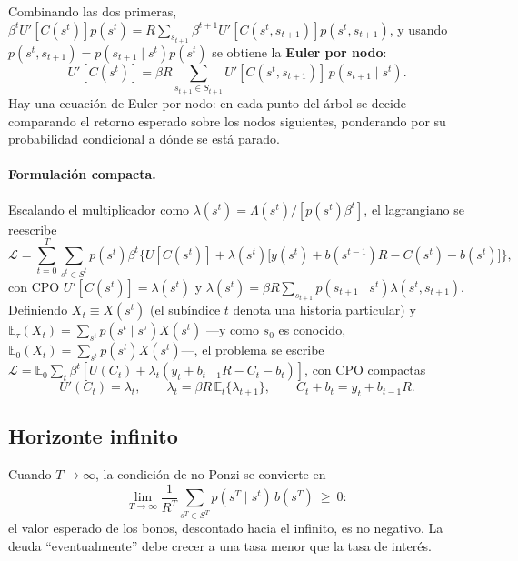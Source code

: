 \documentclass[11pt]{article}
\theoremstyle{definition}
\newcommand{\E}{\mathbb{E}}
\begin{document}
Combinando las dos primeras,
$\beta^{t}U'[C(s^{t})]p(s^{t})=R\sum_{s_{t+1}}\beta^{t+1}U'[C(s^{t},s_{t+1})]p(s^{t},s_{t+1})$, y usando
$p(s^{t},s_{t+1})=p(s_{t+1}\mid s^{t})p(s^{t})$ se obtiene la \textbf{Euler por nodo}:
\begin{equation}
U'[C(s^{t})]=\beta R\!\!\sum_{s_{t+1}\in S_{t+1}}\!\!U'[C(s^{t},s_{t+1})]\,p(s_{t+1}\mid s^{t}).
\end{equation}
Hay una ecuación de Euler por nodo: en cada punto del árbol se decide comparando el retorno esperado
sobre los nodos siguientes, ponderando por su probabilidad condicional a dónde se está parado.

\paragraph{Formulación compacta.} Escalando el multiplicador como
$\lambda(s^{t})=\Lambda(s^{t})/[p(s^{t})\beta^{t}]$, el lagrangiano se reescribe
\begin{equation}
\mathcal{L}=\sum_{t=0}^{T}\sum_{s^{t}\in S^{t}}p(s^{t})\beta^{t}\Big\{U[C(s^{t})]
+\lambda(s^{t})\big[y(s^{t})+b(s^{t-1})R-C(s^{t})-b(s^{t})\big]\Big\},
\end{equation}
con CPO $U'[C(s^{t})]=\lambda(s^{t})$ y
$\lambda(s^{t})=\beta R\sum_{s_{t+1}}p(s_{t+1}\mid s^{t})\lambda(s^{t},s_{t+1})$. Definiendo
$X_{t}\equiv X(s^{t})$ (el subíndice $t$ denota una historia particular) y
$\E_{\tau}(X_{t})=\sum_{s^{t}}p(s^{t}\mid s^{\tau})X(s^{t})$ ---y como $s_{0}$ es conocido,
$\E_{0}(X_{t})=\sum_{s^{t}}p(s^{t})X(s^{t})$---, el problema se escribe
$\mathcal{L}=\E_{0}\sum_{t}\beta^{t}[U(C_{t})+\lambda_{t}(y_{t}+b_{t-1}R-C_{t}-b_{t})]$, con CPO
compactas
\begin{equation}
U'(C_{t})=\lambda_{t},\qquad \lambda_{t}=\beta R\,\E_{t}\{\lambda_{t+1}\},\qquad C_{t}+b_{t}=y_{t}+b_{t-1}R .
\end{equation}

\subsection{Horizonte infinito}

Cuando $T\to\infty$, la condición de no-Ponzi se convierte en
\begin{equation}
\lim_{T\to\infty}\frac{1}{R^{T}}\sum_{s^{T}\in S^{T}}p(s^{T}\mid s^{t})\,b(s^{T})\ \ge\ 0 :
\end{equation}
el valor esperado de los bonos, descontado hacia el infinito, es no negativo. La deuda
``eventualmente'' debe crecer a una tasa menor que la tasa de interés.
\end{document}
